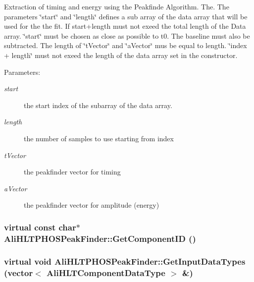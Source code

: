 Extraction of timing and energy using the Peakfinde Algorithm. The. The parameters \char`\"{}start\char`\"{} and \char`\"{}length\char`\"{} defines a sub array of the data array that will be used for the the fit. If start+length must not exeed the total length of the Data array. \char`\"{}start\char`\"{} must be chosen as close as possible to t0. The baseline must also be subtracted. The length of \char`\"{}t\-Vector\char`\"{} and \char`\"{}a\-Vector\char`\"{} mus be equal to length. \char`\"{}index + length\char`\"{} must not exeed the length of the data array set in the constructor. \begin{Desc}
\item[Parameters:]
\begin{description}
\item[{\em start}]the start index of the subarray of the data array. \item[{\em length}]the number of samples to use starting from index \item[{\em t\-Vector}]the peakfinder vector for timing \item[{\em a\-Vector}]the peakfinder vector for amplitude (energy) \end{description}
\end{Desc}
\subsubsection{\setlength{\rightskip}{0pt plus 5cm}virtual const char$\ast$ Ali\-HLTPHOSPeak\-Finder::Get\-Component\-ID ()\hspace{0.3cm}{\tt  [inline, virtual]}}\label{classAliHLTPHOSPeakFinder_a8}


\subsubsection{\setlength{\rightskip}{0pt plus 5cm}virtual void Ali\-HLTPHOSPeak\-Finder::Get\-Input\-Data\-Types (vector$<$ Ali\-HLTComponent\-Data\-Type $>$ \&)\hspace{0.3cm}{\tt  [inline, virtual]}}\label{classAliHLTPHOSPeakFinder_a13}


